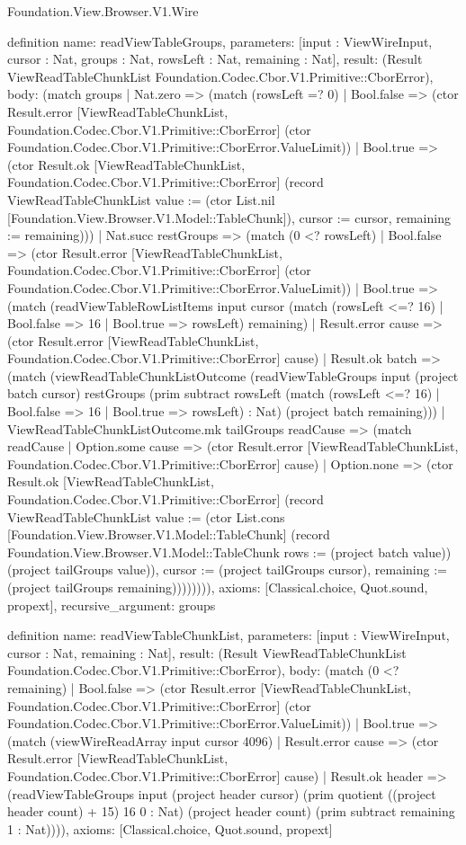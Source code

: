 \begin{lexlean}{Foundation.View.Browser.V1.Wire}
\begin{semanticmodule}
definition{
  name: readViewTableGroups,
  parameters: [input : ViewWireInput, cursor : Nat, groups : Nat, rowsLeft : Nat, remaining : Nat],
  result: (Result ViewReadTableChunkList Foundation.Codec.Cbor.V1.Primitive::CborError),
  body: (match groups
    | Nat.zero => (match (rowsLeft =? 0)
      | Bool.false => (ctor Result.error [ViewReadTableChunkList, Foundation.Codec.Cbor.V1.Primitive::CborError] (ctor Foundation.Codec.Cbor.V1.Primitive::CborError.ValueLimit))
      | Bool.true => (ctor Result.ok [ViewReadTableChunkList, Foundation.Codec.Cbor.V1.Primitive::CborError] (record ViewReadTableChunkList {value := (ctor List.nil [Foundation.View.Browser.V1.Model::TableChunk]), cursor := cursor, remaining := remaining})))
    | Nat.succ restGroups => (match (0 <? rowsLeft)
      | Bool.false => (ctor Result.error [ViewReadTableChunkList, Foundation.Codec.Cbor.V1.Primitive::CborError] (ctor Foundation.Codec.Cbor.V1.Primitive::CborError.ValueLimit))
      | Bool.true => (match (readViewTableRowListItems input cursor (match (rowsLeft <=? 16)
          | Bool.false => 16
          | Bool.true => rowsLeft) remaining)
        | Result.error cause => (ctor Result.error [ViewReadTableChunkList, Foundation.Codec.Cbor.V1.Primitive::CborError] cause)
        | Result.ok batch => (match (viewReadTableChunkListOutcome (readViewTableGroups input (project batch cursor) restGroups (prim subtract rowsLeft (match (rowsLeft <=? 16)
            | Bool.false => 16
            | Bool.true => rowsLeft) : Nat) (project batch remaining)))
          | ViewReadTableChunkListOutcome.mk tailGroups readCause => (match readCause
            | Option.some cause => (ctor Result.error [ViewReadTableChunkList, Foundation.Codec.Cbor.V1.Primitive::CborError] cause)
            | Option.none => (ctor Result.ok [ViewReadTableChunkList, Foundation.Codec.Cbor.V1.Primitive::CborError] (record ViewReadTableChunkList {value := (ctor List.cons [Foundation.View.Browser.V1.Model::TableChunk] (record Foundation.View.Browser.V1.Model::TableChunk {rows := (project batch value)}) (project tailGroups value)), cursor := (project tailGroups cursor), remaining := (project tailGroups remaining)}))))))),
  axioms: [Classical.choice, Quot.sound, propext],
  recursive_argument: groups
}

definition{
  name: readViewTableChunkList,
  parameters: [input : ViewWireInput, cursor : Nat, remaining : Nat],
  result: (Result ViewReadTableChunkList Foundation.Codec.Cbor.V1.Primitive::CborError),
  body: (match (0 <? remaining)
    | Bool.false => (ctor Result.error [ViewReadTableChunkList, Foundation.Codec.Cbor.V1.Primitive::CborError] (ctor Foundation.Codec.Cbor.V1.Primitive::CborError.ValueLimit))
    | Bool.true => (match (viewWireReadArray input cursor 4096)
      | Result.error cause => (ctor Result.error [ViewReadTableChunkList, Foundation.Codec.Cbor.V1.Primitive::CborError] cause)
      | Result.ok header => (readViewTableGroups input (project header cursor) (prim quotient ((project header count) + 15) 16 0 : Nat) (project header count) (prim subtract remaining 1 : Nat)))),
  axioms: [Classical.choice, Quot.sound, propext]
}


\end{semanticmodule}
\end{lexlean}

